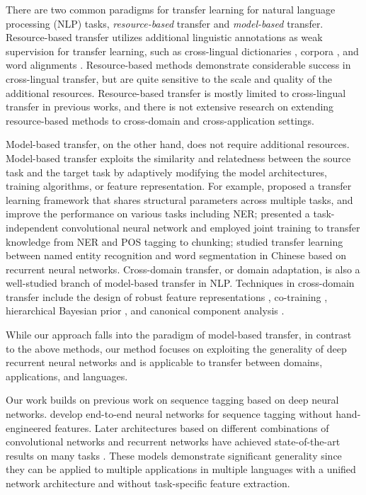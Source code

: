 \documentclass{article} \usepackage{iclr2017_conference,times}
\begin{document}
There are two common paradigms for transfer learning for natural language processing (NLP) tasks, \textit{resource-based} transfer and \textit{model-based} transfer. Resource-based transfer utilizes additional linguistic annotations as weak supervision for transfer learning, such as cross-lingual dictionaries \citep{zirikly2cross}, corpora \citep{wang2013cross}, and word alignments \citep{yarowsky2001inducing}. Resource-based methods demonstrate considerable success in cross-lingual transfer, but are quite sensitive to the scale and quality of the additional resources. Resource-based transfer is mostly limited to cross-lingual transfer in previous works, and there is not extensive research on extending resource-based methods to cross-domain and cross-application settings.

Model-based transfer, on the other hand, does not require additional resources. Model-based transfer exploits the similarity and relatedness between the source task and the target task by adaptively modifying the model architectures, training algorithms, or feature representation. For example, \cite{ando2005framework} proposed a transfer learning framework that shares structural parameters across multiple tasks, and improve the performance on various tasks including NER; \cite{collobert2011natural} presented a task-independent convolutional neural network and employed joint training to transfer knowledge from NER and POS tagging to chunking; \cite{pengimproving} studied transfer learning between named entity recognition and word segmentation in Chinese based on recurrent neural networks. Cross-domain transfer, or domain adaptation, is also a well-studied branch of model-based transfer in NLP. Techniques in cross-domain transfer include the design of robust feature representations \citep{schnabel2014flors}, co-training \citep{chen2011co}, hierarchical Bayesian prior \citep{finkel2009hierarchical}, and canonical component analysis \citep{kim2015new}.

While our approach falls into the paradigm of model-based transfer, in contrast to the above methods, our method focuses on exploiting the generality of deep recurrent neural networks and is applicable to transfer between domains, applications, and languages.

Our work builds on previous work on sequence tagging based on deep neural networks. \cite{collobert2011natural} develop end-to-end neural networks for sequence tagging without hand-engineered features. Later architectures based on different combinations of convolutional networks and recurrent networks have achieved state-of-the-art results on many tasks \citep{collobert2011natural,huang2015bidirectional,chiu2015named,lample2016neural,ma2016end}. These models demonstrate significant generality since they can be applied to multiple applications in multiple languages with a unified network architecture and without task-specific feature extraction.
\end{document}
